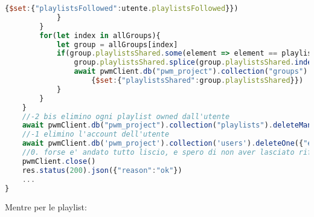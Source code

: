 \begin{lstlisting}[language=JavaScript]
                    {$set:{"playlistsFollowed":utente.playlistsFollowed}})
            }
        }
        for(let index in allGroups){
            let group = allGroups[index]
            if(group.playlistsShared.some(element => element == playlist.name)){
                group.playlistsShared.splice(group.playlistsShared.indexOf(playlist.name),1)
                await pwmClient.db("pwm_project").collection("groups").updateOne({"name":group.name},
                    {$set:{"playlistsShared":group.playlistsShared}})
            }
        }
    }
    //-2 bis elimino ogni playlist owned dall'utente
    await pwmClient.db("pwm_project").collection("playlists").deleteMany({"owner":user.userName})
    //-1 elimino l'account dell'utente
    await pwmClient.db('pwm_project').collection('users').deleteOne({"email":decoded.email})
    //0. forse e' andato tutto liscio, e spero di non aver lasciato riferimenti pending da qualche parte
    pwmClient.close()
    res.status(200).json({"reason":"ok"}) 
    ...
}
\end{lstlisting}
Mentre per le playlist:

